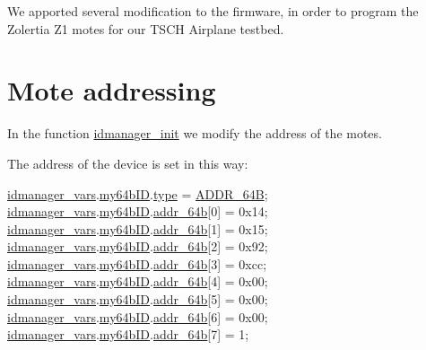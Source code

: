We apported several modification to the firmware, in order to program the Zolertia Z1 motes for our T\+S\+CH Airplane testbed.



 \hypertarget{_l_k_n_contribution_Addr_edits}{}\section{Mote addressing}\label{_l_k_n_contribution_Addr_edits}
In the function \hyperlink{group___i_d_manager_ga3e974443ae75269d00c3de03992a1669}{idmanager\+\_\+init} we modify the address of the motes.

The address of the device is set in this way\+: 
\begin{DoxyCodeInclude}
   \hyperlink{idmanager_8c_a3b050a996ba4875e4327fb81fbb18c5b}{idmanager\_vars}.\hyperlink{structidmanager__vars__t_a41c964b52056d4022c136419ab5d0704}{my64bID}.\hyperlink{structopen__addr__t_a2abdbb15dedda5606521852a4b4fc0ba}{type}         = \hyperlink{opendefs_8h_a52864abcf6ebd8d120995b36fe6ce06eaaca0da977da87a831efebdda8b376fa1}{ADDR\_64B};
   \hyperlink{idmanager_8c_a3b050a996ba4875e4327fb81fbb18c5b}{idmanager\_vars}.\hyperlink{structidmanager__vars__t_a41c964b52056d4022c136419ab5d0704}{my64bID}.\hyperlink{structopen__addr__t_a7ca9b0c966447d191c6f05e375571231}{addr\_64b}[0]   = 0x14;
   \hyperlink{idmanager_8c_a3b050a996ba4875e4327fb81fbb18c5b}{idmanager\_vars}.\hyperlink{structidmanager__vars__t_a41c964b52056d4022c136419ab5d0704}{my64bID}.\hyperlink{structopen__addr__t_a7ca9b0c966447d191c6f05e375571231}{addr\_64b}[1]   = 0x15;
   \hyperlink{idmanager_8c_a3b050a996ba4875e4327fb81fbb18c5b}{idmanager\_vars}.\hyperlink{structidmanager__vars__t_a41c964b52056d4022c136419ab5d0704}{my64bID}.\hyperlink{structopen__addr__t_a7ca9b0c966447d191c6f05e375571231}{addr\_64b}[2]   = 0x92;
   \hyperlink{idmanager_8c_a3b050a996ba4875e4327fb81fbb18c5b}{idmanager\_vars}.\hyperlink{structidmanager__vars__t_a41c964b52056d4022c136419ab5d0704}{my64bID}.\hyperlink{structopen__addr__t_a7ca9b0c966447d191c6f05e375571231}{addr\_64b}[3]   = 0xcc;
   \hyperlink{idmanager_8c_a3b050a996ba4875e4327fb81fbb18c5b}{idmanager\_vars}.\hyperlink{structidmanager__vars__t_a41c964b52056d4022c136419ab5d0704}{my64bID}.\hyperlink{structopen__addr__t_a7ca9b0c966447d191c6f05e375571231}{addr\_64b}[4]   = 0x00;
   \hyperlink{idmanager_8c_a3b050a996ba4875e4327fb81fbb18c5b}{idmanager\_vars}.\hyperlink{structidmanager__vars__t_a41c964b52056d4022c136419ab5d0704}{my64bID}.\hyperlink{structopen__addr__t_a7ca9b0c966447d191c6f05e375571231}{addr\_64b}[5]   = 0x00;
   \hyperlink{idmanager_8c_a3b050a996ba4875e4327fb81fbb18c5b}{idmanager\_vars}.\hyperlink{structidmanager__vars__t_a41c964b52056d4022c136419ab5d0704}{my64bID}.\hyperlink{structopen__addr__t_a7ca9b0c966447d191c6f05e375571231}{addr\_64b}[6]   = 0x00;
   \hyperlink{idmanager_8c_a3b050a996ba4875e4327fb81fbb18c5b}{idmanager\_vars}.\hyperlink{structidmanager__vars__t_a41c964b52056d4022c136419ab5d0704}{my64bID}.\hyperlink{structopen__addr__t_a7ca9b0c966447d191c6f05e375571231}{addr\_64b}[7]   = 1;
\end{DoxyCodeInclude}
